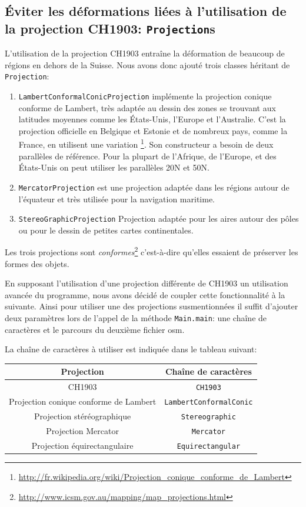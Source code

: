 \documentclass[11pt,a4paper]{article}
\begin{document}
\subsection{Éviter les déformations liées à l'utilisation de la projection CH1903: \texttt{Projection}s}
L'utilisation de la projection CH1903 entraîne la déformation de beaucoup de régions en dehors de la Suisse. Nous avons donc ajouté trois classes héritant de \texttt{Projection}:
\begin{enumerate}
    \item \texttt{LambertConformalConicProjection} implémente la projection conique conforme de Lambert, très adaptée au dessin des zones se trouvant aux latitudes moyennes comme les États-Unis, l'Europe et l'Australie. C'est la projection officielle en Belgique et Estonie et de nombreux pays, comme la France, en utilisent une variation \footnote{\url{http://fr.wikipedia.org/wiki/Projection_conique_conforme_de_Lambert}}. Son constructeur a besoin de deux parallèles de référence. Pour la plupart de l'Afrique, de l'Europe, et des États-Unis on peut utiliser les parallèles 20\degre N et 50\degre N. 
    \item \texttt{MercatorProjection} est une projection adaptée dans les régions autour de l'équateur et très utilisée pour la navigation maritime.
    \item \texttt{StereoGraphicProjection} Projection adaptée pour les aires autour des pôles ou pour le dessin de petites cartes continentales.
\end{enumerate}
Les trois projections sont \textit{conformes}\footnote{\url{http://www.icsm.gov.au/mapping/map_projections.html}} c'est-à-dire qu'elles essaient de préserver les formes des objets.

En supposant l'utilisation d'une projection différente de CH1903 un utilisation avancée du programme, nous avons décidé de coupler cette fonctionnalité à la suivante. Ainsi pour utiliser une des projections susmentionnées il suffit d'ajouter deux paramètres lors de l'appel de la méthode \texttt{Main.main}: une chaîne de caractères et le parcours du deuxième fichier osm.

La chaîne de caractères à utiliser est indiquée dans le tableau suivant:

\begin{center}
    \begin{tabular}{c | c }
	Projection & Chaîne de caractères \\ \hline
	CH1903 & \texttt{CH1903} \\
	Projection conique conforme de Lambert & \texttt{LambertConformalConic} \\
	Projection stéréographique & \texttt{Stereographic} \\
	Projection Mercator & \texttt{Mercator} \\
	Projection équirectangulaire & \texttt{Equirectangular}
    \end{tabular}
\end{center}
\end{document}
